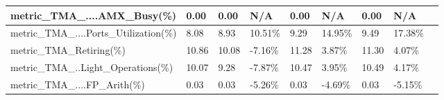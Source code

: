 \documentclass[12pt]{article}
\begin{document}
\begin{longtable}{|m{139.55pt}|m{40.35pt}|m{36.25pt}|m{36.25pt}|m{36.25pt}|m{42.10pt}|m{30.30pt}|m{44.65pt}|@{}m{0pt}@{}}
\raggedright\arraybackslash{}metric\_\allowbreak{}TMA\_\allowbreak{}....AMX\_\allowbreak{}Busy(\%) & \centering\arraybackslash{}0.00 & \centering\arraybackslash{}0.00 & \cellcolor[HTML]{D9D9D9}\centering\arraybackslash{}N/A & \centering\arraybackslash{}0.00 & \cellcolor[HTML]{D9D9D9}\centering\arraybackslash{}N/A & \centering\arraybackslash{}0.00 & \cellcolor[HTML]{D9D9D9}\centering\arraybackslash{}N/A & \rule[-0.00pt]{0pt}{14.40pt} \\ \hline
\raggedright\arraybackslash{}metric\_\allowbreak{}TMA\_\allowbreak{}....Ports\_\allowbreak{}Utilization(\%) & \centering\arraybackslash{}8.08 & \centering\arraybackslash{}8.93 & \cellcolor[HTML]{D9D9D9}\centering\arraybackslash{}10.51\% & \centering\arraybackslash{}9.29 & \cellcolor[HTML]{D9D9D9}\centering\arraybackslash{}14.95\% & \centering\arraybackslash{}9.49 & \cellcolor[HTML]{D9D9D9}\centering\arraybackslash{}17.38\% & \rule[-0.00pt]{0pt}{14.40pt} \\ \hline
\cellcolor[HTML]{F8CBAD}\raggedright\arraybackslash{}metric\_\allowbreak{}TMA\_\allowbreak{}Retiring(\%) & \cellcolor[HTML]{F8CBAD}\centering\arraybackslash{}10.86 & \cellcolor[HTML]{F8CBAD}\centering\arraybackslash{}10.08 & \cellcolor[HTML]{F8CBAD}\centering\arraybackslash{}-7.16\% & \cellcolor[HTML]{F8CBAD}\centering\arraybackslash{}11.28 & \cellcolor[HTML]{F8CBAD}\centering\arraybackslash{}3.87\% & \cellcolor[HTML]{F8CBAD}\centering\arraybackslash{}11.30 & \cellcolor[HTML]{F8CBAD}\centering\arraybackslash{}4.07\% & \rule[-0.00pt]{0pt}{14.40pt} \\ \hline
\raggedright\arraybackslash{}metric\_\allowbreak{}TMA\_\allowbreak{}..Light\_\allowbreak{}Operations(\%) & \centering\arraybackslash{}10.07 & \centering\arraybackslash{}9.28 & \cellcolor[HTML]{D9D9D9}\centering\arraybackslash{}-7.87\% & \centering\arraybackslash{}10.47 & \cellcolor[HTML]{D9D9D9}\centering\arraybackslash{}3.95\% & \centering\arraybackslash{}10.49 & \cellcolor[HTML]{D9D9D9}\centering\arraybackslash{}4.17\% & \rule[-0.00pt]{0pt}{14.40pt} \\ \hline
\raggedright\arraybackslash{}metric\_\allowbreak{}TMA\_\allowbreak{}....FP\_\allowbreak{}Arith(\%) & \centering\arraybackslash{}0.03 & \centering\arraybackslash{}0.03 & \cellcolor[HTML]{D9D9D9}\centering\arraybackslash{}-5.26\% & \centering\arraybackslash{}0.03 & \cellcolor[HTML]{D9D9D9}\centering\arraybackslash{}-4.69\% & \centering\arraybackslash{}0.03 & \cellcolor[HTML]{D9D9D9}\centering\arraybackslash{}-5.15\% & \rule[-0.00pt]{0pt}{14.40pt} \\ \hline

\end{longtable}
\end{document}

